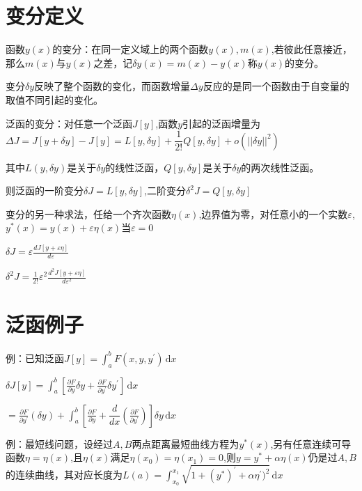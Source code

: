 \documentclass{article}
\begin{document}
\title{}
\maketitle



\section{变分定义}
函数$y(x)$的变分：在同一定义域上的两个函数$y(x),m(x)$,若彼此任意接近，那么$m(x)$与$y(x)$之差，记$\delta y(x)=m(x)-y(x)$称$y(x)$的变分。

变分$\delta y$反映了整个函数的变化，而函数增量$ \Delta y $反应的是同一个函数由于自变量的取值不同引起的变化。

泛函的变分：对任意一个泛函$J[y]$,函数$y$引起的泛函增量为$\Delta J=J[y+\delta y]-J[y]=L[y,\delta y]+\dfrac{1}{2!}Q[y,\delta y]+o(||\delta y||^2)$

其中$L(y,\delta y)$是关于$\delta y$的线性泛函，$Q[y,\delta y]$是关于$\delta y$的两次线性泛函。

则泛函的一阶变分$\delta J=L[y,\delta y]$,二阶变分$\delta^2J=Q[y,\delta y]$

变分的另一种求法，任给一个齐次函数$\eta(x)$,边界值为零，对任意小的一个实数$\varepsilon$,$y^{*}(x)=y(x)+\varepsilon\eta(x)$当$\varepsilon=0$

$\delta J=\varepsilon\frac{dJ[y+\varepsilon\eta]}{d\varepsilon}$

$\delta^2 J=\frac{1}{2!}\varepsilon^2\frac{d^2J[y+\varepsilon\eta]}{d\varepsilon^2}$
\section{泛函例子}
例：已知泛函$J[y]=\int_{a}^{b}F(x,y,y^{'})\,\mathrm{d}x$

$ \delta J[y]=\int_{a}^{b}[\frac{\partial F}{\partial y}\delta y+\frac{\partial F}{\partial y^{'}}\delta y^{'}]\,\mathrm{d}x $

$=\frac{\partial F}{\partial y^{'}}(\delta y)+\int_{a}^{b}[\frac{\partial F}{\partial y}+\dfrac{d}{dx}(\frac{\partial F}{\partial y^{'}})]\delta y\,\mathrm{d}x $

例：最短线问题，设经过$A,B$两点距离最短曲线方程为$y^{*}(x)$,另有任意连续可导函数$\eta=\eta(x)$,且$\eta(x)$满足$\eta(x_{0})=\eta(x_{1})=0$,则$y=y^{*}+\alpha\eta(x)$仍是过$A,B$的连续曲线，其对应长度为$L(a)=\int_{x_{0}}^{x_{1}}\sqrt{1+(y^{*})^{'}+\alpha\eta^{'})^2}\,\mathrm{d}x$
\end{document}
